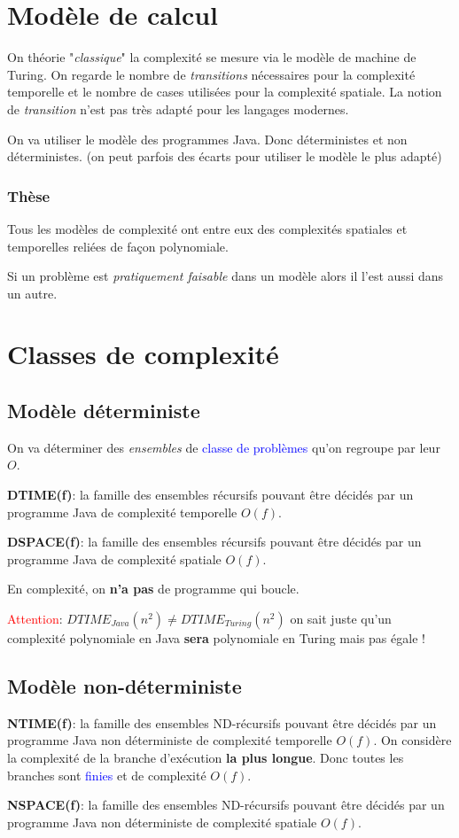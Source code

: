 \documentclass{report}
\begin{document}
\section{Modèle de calcul}
On théorie "\textit{classique}" la complexité se mesure via le modèle de machine de Turing. On regarde le nombre de \textit{transitions} nécessaires pour la complexité temporelle et le nombre de cases utilisées pour la complexité spatiale. La notion de \textit{transition} n'est pas très adapté pour les langages modernes.\par
On va utiliser le modèle des programmes Java. Donc déterministes et non déterministes. (on peut parfois des écarts pour utiliser le modèle le plus adapté)
\subsubsection{Thèse}
Tous les modèles de complexité ont entre eux des complexités spatiales et temporelles reliées de façon polynomiale.\par
Si un problème est \textit{pratiquement faisable} dans un modèle alors il l'est aussi dans un autre.

\section{Classes de complexité}
\subsection{Modèle déterministe}
On va déterminer des \textit{ensembles} de \textcolor{blue}{classe de problèmes} qu'on regroupe par leur $O$.\par
\textbf{DTIME(f)}: la famille des ensembles récursifs pouvant être décidés par un programme Java de complexité temporelle $O(f)$.\par 
\textbf{DSPACE(f)}: la famille des ensembles récursifs pouvant être décidés par un programme Java de complexité spatiale $O(f)$.\par
En complexité, on \textbf{n'a pas} de programme qui boucle.\par
\textcolor{red}{Attention}: $DTIME_{Java}(n^2) \neq DTIME_{Turing}(n^2)$ on sait juste qu'un complexité polynomiale en Java \textbf{sera} polynomiale en Turing mais pas égale !

\subsection{Modèle non-déterministe}
\textbf{NTIME(f)}: la famille des ensembles ND-récursifs pouvant être décidés par un programme Java non déterministe de complexité temporelle $O(f)$. On considère la complexité de la branche d'exécution \textbf{la plus longue}. Donc toutes les branches sont \textcolor{blue}{finies} et de complexité $O(f)$.\par
\textbf{NSPACE(f)}: la famille des ensembles ND-récursifs pouvant être décidés par un programme Java non déterministe de complexité spatiale $O(f)$.
\end{document}

